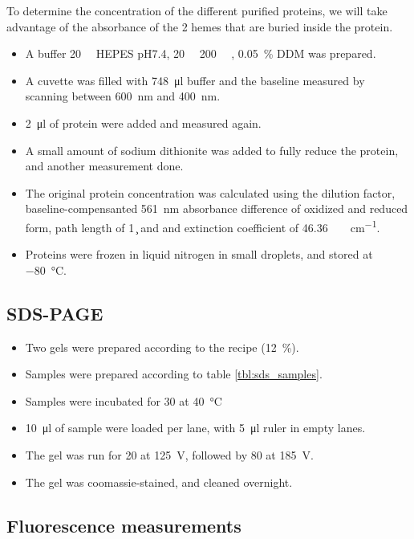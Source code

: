 To determine the concentration of the different purified proteins, we will take
advantage of the absorbance of the 2 hemes that are buried inside the protein.

\begin{itemize}
	\item A buffer \SI{20}{\milli\Molar} HEPES pH7.4, \SI{20}{\milli\Molar}
		 \SI{200}{\milli\Molar} , \SI{0.05}{\percent}
		DDM was prepared.
	\item A cuvette was filled with \SI{748}{\ul} buffer and the baseline measured by scanning between \SI{600}{\nm} and \SI{400}{\nm}.
	\item \SI{2}{\ul} of protein were added and measured again.
	\item A small amount of sodium dithionite was added to fully reduce the
		protein, and another measurement done.
	\item The original protein concentration was calculated using the
		dilution factor, baseline-compensanted \SI{561}{\nm} absorbance
		difference of oxidized and reduced form, path length of
		\SI{1}{\c} and and extinction coefficient of
		\SI{46.36}{\per\milli\Molar\per\cm}.
	\item Proteins were frozen in liquid nitrogen in small droplets, and
		stored at \SI{-80}{\celsius}.
\end{itemize}

\subsection{SDS-PAGE}

\begin{itemize}
	\item Two gels were prepared according to the recipe (\SI{12}{\percent}).
	\item Samples were prepared according to table \ref{tbl:sds_samples}.
	\item Samples were incubated for \SI{30}{\min} at \SI{40}{\celsius}
	\item \SI{10}{\ul} of sample were loaded per lane, with \SI{5}{\ul} ruler in empty lanes.
	\item The gel was run for \SI{20}{\min} at \SI{125}{\V}, followed by \SI{80}{\min} at \SI{185}{\V}.
	\item The gel was coomassie-stained, and cleaned overnight.
\end{itemize}


\subsection{Fluorescence measurements}

